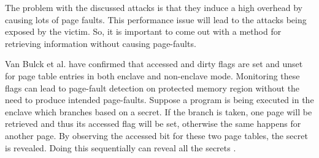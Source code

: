 \begin{figure}[htp]
	\centering
	\quad
	\caption{}
\end{figure}

The problem with the discussed attacks is that they induce a high overhead by causing lots of page faults. This performance issue will lead to the attacks being exposed by the victim. So, it is important to come out with a method for retrieving information without causing page-faults.

Van Bulck et al. \cite{stealthy} have confirmed that accessed and dirty flags are set and unset for page table entries in both enclave and non-enclave mode. Monitoring these flags can lead to page-fault detection on protected memory region without the need to produce intended page-faults. Suppose a program is being executed in the enclave which branches based on a secret. If the branch is taken, one page will be retrieved and thus its accessed flag will be set, otherwise the same happens for another page. By observing the accessed bit for these two page tables, the secret is revealed. Doing this sequentially can reveal all the secrets \cite{stealthy}.

